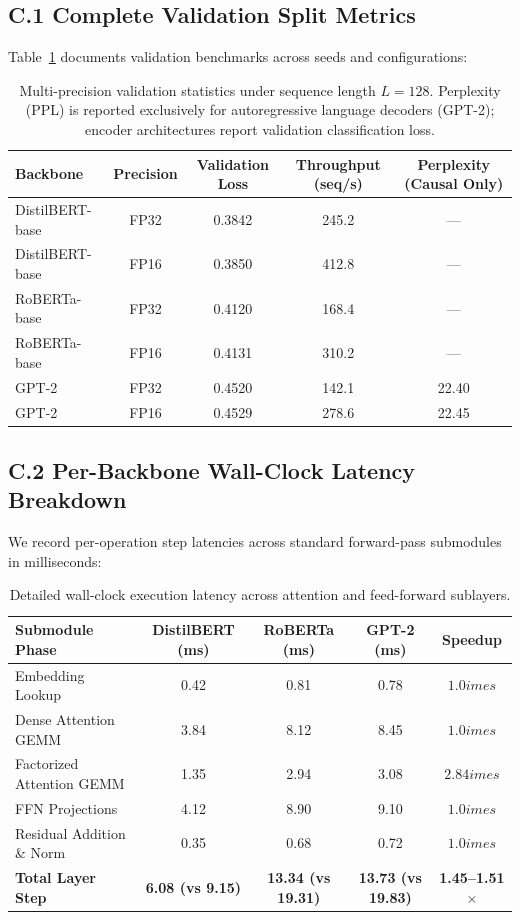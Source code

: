 \documentclass{article}
\begin{document}
\subsection*{C.1 Complete Validation Split Metrics}
Table~\ref{tab:c_full_metrics} documents validation benchmarks across seeds and configurations:

\begin{table}[H]
\centering
\small
\begin{tabular}{lcccc}
\toprule
\textbf{Backbone} & \textbf{Precision} & \textbf{Validation Loss} & \textbf{Throughput (seq/s)} & \textbf{Perplexity (Causal Only)} \\
\midrule
DistilBERT-base & FP32 & 0.3842 & 245.2 & --- \\
DistilBERT-base & FP16 & 0.3850 & 412.8 & --- \\
RoBERTa-base & FP32 & 0.4120 & 168.4 & --- \\
RoBERTa-base & FP16 & 0.4131 & 310.2 & --- \\
GPT-2 & FP32 & 0.4520 & 142.1 & 22.40 \\
GPT-2 & FP16 & 0.4529 & 278.6 & 22.45 \\
\bottomrule
\end{tabular}
\caption{Multi-precision validation statistics under sequence length $L=128$. Perplexity (PPL) is reported exclusively for autoregressive language decoders (GPT-2); encoder architectures report validation classification loss.}
\label{tab:c_full_metrics}
\end{table}

\subsection*{C.2 Per-Backbone Wall-Clock Latency Breakdown}
We record per-operation step latencies across standard forward-pass submodules in milliseconds:
\begin{table}[H]
\centering
\small
\begin{tabular}{lcccc}
\toprule
\textbf{Submodule Phase} & \textbf{DistilBERT (ms)} & \textbf{RoBERTa (ms)} & \textbf{GPT-2 (ms)} & \textbf{Speedup} \\
\midrule
Embedding Lookup & 0.42 & 0.81 & 0.78 & $1.0	imes$ \\
Dense Attention GEMM & 3.84 & 8.12 & 8.45 & $1.0	imes$ \\
Factorized Attention GEMM & 1.35 & 2.94 & 3.08 & $2.84	imes$ \\
FFN Projections & 4.12 & 8.90 & 9.10 & $1.0	imes$ \\
Residual Addition \& Norm & 0.35 & 0.68 & 0.72 & $1.0	imes$ \\
\midrule
\textbf{Total Layer Step} & \textbf{6.08 (vs 9.15)} & \textbf{13.34 (vs 19.31)} & \textbf{13.73 (vs 19.83)} & \textbf{1.45--1.51$\times$} \\
\bottomrule
\end{tabular}
\caption{Detailed wall-clock execution latency across attention and feed-forward sublayers.}
\label{tab:latency_breakdown}
\end{table}
\end{document}
